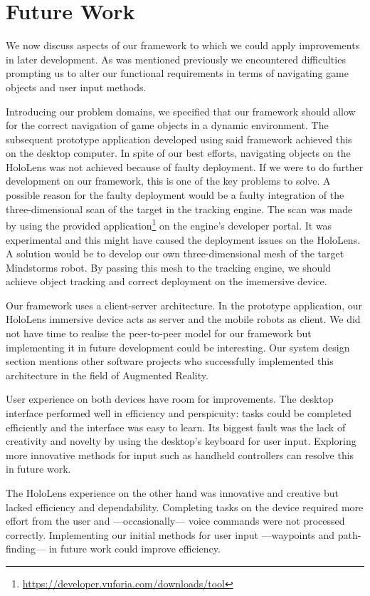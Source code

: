 \section{Future Work}
We now discuss aspects of our framework to which we could apply improvements in later development. As was mentioned previously we encountered difficulties prompting us to alter our functional requirements in terms of navigating game objects and user input methods.

Introducing our problem domains, we specified that our framework should allow for the correct navigation of game objects in a dynamic environment. The subsequent prototype application developed using said framework achieved this on the desktop computer. In spite of our best efforts, navigating objects on the HoloLens was not achieved because of faulty deployment. If we were to do further development on our framework, this is one of the key problems to solve. A possible reason for the faulty deployment would be a faulty integration of the three-dimensional scan of the target in the tracking engine. The scan was made by using the provided application\footnote{\protect\url{https://developer.vuforia.com/downloads/tool}} on the engine's developer portal. It was experimental and this might have caused the deployment issues on the HoloLens. A solution would be to develop our own three-dimensional mesh of the target Mindstorms robot. By passing this mesh to the tracking engine, we should achieve object tracking and correct deployment on the imemersive device.

Our framework uses a client-server architecture. In the prototype application, our HoloLens immersive device acts as server and the mobile robots as client. We did not have time to realise the peer-to-peer model for our framework but implementing it in future development could be interesting. Our system design section mentions other software projects who successfully implemented this architecture in the field of Augmented Reality. 

User experience on both devices have room for improvements. The desktop interface performed well in efficiency and perspicuity: tasks could be completed efficiently and the interface was easy to learn. Its biggest fault was the lack of creativity and novelty by using the desktop's keyboard for user input. Exploring more innovative methods for input such as handheld controllers can resolve this in future work.

The HoloLens experience on the other hand was innovative and creative but lacked efficiency and dependability. Completing tasks on the device required more effort from the user and ---occasionally--- voice commands were not processed correctly. Implementing our initial methods for user input ---waypoints and path-finding--- in future work could improve efficiency.



